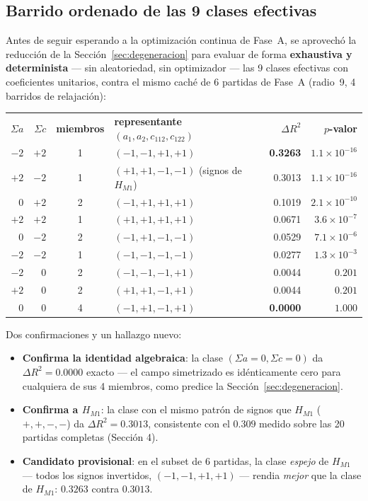 \documentclass[11pt, a4paper]{article}
\newcommand{\TH}[1]{\cellcolor{cTHbg}\color{white}\textbf{#1}}
\newcommand{\good}[1]{\color{cGood}\textbf{#1}}
\newcommand{\bad}[1]{\color{cBad}\textbf{#1}}
\begin{document}
\subsection{Barrido ordenado de las 9 clases efectivas}
\label{sec:barrido9}

Antes de seguir esperando a la optimizaci\'on continua de Fase~A, se
aprovech\'o la reducci\'on de la Secci\'on~\ref{sec:degeneracion} para
evaluar de forma \textbf{exhaustiva y determinista} --- sin
aleatoriedad, sin optimizador --- las 9 clases efectivas con
coeficientes unitarios, contra el mismo cach\'e de 6 partidas de
Fase~A (radio~9, 4 barridos de relajaci\'on):

\medskip
\begin{center}
\begin{tabular}{rrcp{4cm}rr}
  \TH{$\Sigma a$} & \TH{$\Sigma c$} & \TH{miembros} & \TH{representante $(a_1,a_2,c_{112},c_{122})$} & \TH{$\Delta R^2$} & \TH{$p$-valor} \\[1pt]
  $-2$ & $+2$ & 1 & $(-1,-1,+1,+1)$ & \good{0.3263} & $1.1\times10^{-16}$ \\
  $+2$ & $-2$ & 1 & $(+1,+1,-1,-1)$ \small (signos de $H_{M1}$) & 0.3013 & $1.1\times10^{-16}$ \\
  $0$  & $+2$ & 2 & $(-1,+1,+1,+1)$ & 0.1019 & $2.1\times10^{-10}$ \\
  $+2$ & $+2$ & 1 & $(+1,+1,+1,+1)$ & 0.0671 & $3.6\times10^{-7}$ \\
  $0$  & $-2$ & 2 & $(-1,+1,-1,-1)$ & 0.0529 & $7.1\times10^{-6}$ \\
  $-2$ & $-2$ & 1 & $(-1,-1,-1,-1)$ & 0.0277 & $1.3\times10^{-3}$ \\
  $-2$ & $0$  & 2 & $(-1,-1,-1,+1)$ & 0.0044 & $0.201$ \\
  $+2$ & $0$  & 2 & $(+1,+1,-1,+1)$ & 0.0044 & $0.201$ \\
  $0$  & $0$  & 4 & $(-1,+1,-1,+1)$ & \bad{0.0000} & $1.000$ \\
\end{tabular}
\end{center}
\medskip

Dos confirmaciones y un hallazgo nuevo:

\begin{itemize}
  \item \textbf{Confirma la identidad algebraica}: la clase
        $(\Sigma a{=}0,\Sigma c{=}0)$ da $\Delta R^2=0.0000$ exacto
        --- el campo simetrizado es id\'enticamente cero para
        cualquiera de sus 4 miembros, como predice la
        Secci\'on~\ref{sec:degeneracion}.
  \item \textbf{Confirma a $H_{M1}$}: la clase con el mismo patr\'on de
        signos que $H_{M1}$ ($+,+,-,-$) da $\Delta R^2=0.3013$,
        consistente con el $0.309$ medido sobre las 20 partidas
        completas (Secci\'on 4).
  \item \textbf{Candidato provisional}: en el subset de 6 partidas, la
        clase \emph{espejo} de $H_{M1}$ --- todos los signos
        invertidos, $(-1,-1,+1,+1)$ --- rendia \emph{mejor} que la
        clase de $H_{M1}$: $0.3263$ contra $0.3013$.
\end{itemize}
\end{document}
